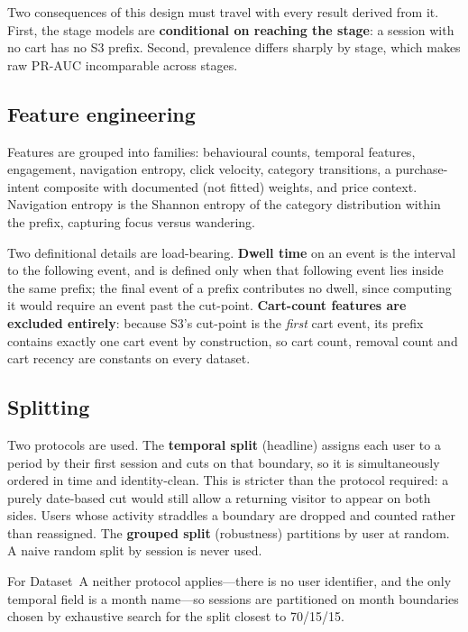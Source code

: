 \documentclass[review,3p,times,authoryear]{elsarticle}   %
\begin{document}
Two consequences of this design must travel with every result derived from it.
First, the stage models are \textbf{conditional on reaching the stage}: a session
with no cart has no S3 prefix. Second, prevalence differs sharply by stage, which
makes raw PR-AUC incomparable across stages.

\subsection{Feature engineering}

Features are grouped into families: behavioural counts, temporal features,
engagement, navigation entropy, click velocity, category transitions, a
purchase-intent composite with documented (not fitted) weights, and price context.
Navigation entropy is the Shannon entropy of the category distribution within the
prefix, capturing focus versus wandering.

Two definitional details are load-bearing. \textbf{Dwell time} on an event is the
interval to the following event, and is defined only when that following event
lies inside the same prefix; the final event of a prefix contributes no dwell,
since computing it would require an event past the cut-point.
\textbf{Cart-count features are excluded entirely}: because S3's cut-point is the
\emph{first} cart event, its prefix contains exactly one cart event by
construction, so cart count, removal count and cart recency are constants on every
dataset.

\subsection{Splitting}

Two protocols are used. The \textbf{temporal split} (headline) assigns each user to
a period by their first session and cuts on that boundary, so it is simultaneously
ordered in time and identity-clean. This is stricter than the protocol required: a
purely date-based cut would still allow a returning visitor to appear on both sides.
Users whose activity straddles a boundary are dropped and counted rather than
reassigned. The \textbf{grouped split} (robustness) partitions by user at random. A
naive random split by session is never used.

For Dataset~A neither protocol applies---there is no user identifier, and the only
temporal field is a month name---so sessions are partitioned on month boundaries
chosen by exhaustive search for the split closest to 70/15/15.
\end{document}
